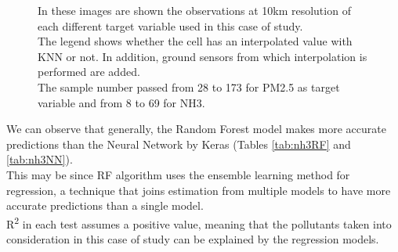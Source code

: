 \begin{figure}[H] 
    \centering
    \hfill%
    \caption{In these images are shown the observations at 10km resolution of each different target variable used in this case of study. \\
    The legend shows whether the cell has an interpolated value with KNN or not. In addition, ground sensors from which interpolation is performed are added.\\ 
    The sample number passed from 28 to 173 for PM2.5 as target variable and from 8 to 69 for NH3.}
    \label{fig:comparison-sensors}
\end{figure}
We can observe that generally, the Random Forest model makes more accurate predictions than the Neural Network by Keras (Tables \ref{tab:nh3RF} and \ref{tab:nh3NN}). \\
This may be since RF algorithm uses the ensemble learning method for regression, a technique that joins estimation from multiple models to have more accurate predictions than a single model.\\ 
R\textsuperscript{2} in each test assumes a positive value, meaning that the pollutants taken into consideration in this case of study can be explained by the regression models. 

